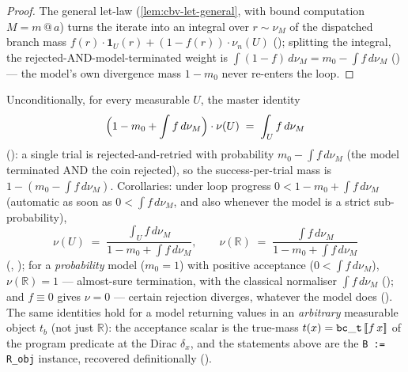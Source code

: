 \begin{proof}
The general let-law (\autoref{lem:cbv-let-general}, with bound
computation $M = m\,@\,a$) turns the iterate into an integral over
$r \sim \nu_M$ of the dispatched branch mass
$f(r)\cdot\mathbf{1}_U(r) + (1 - f(r))\cdot\nu_n(U)$
(); splitting the
integral, the rejected-AND-model-terminated weight is
$\int (1 - f)\,d\nu_M = m_0 - \int f\,d\nu_M$
() --- the model's
own divergence mass $1 - m_0$ never re-enters the loop.
\end{proof}

\begin{theorem}\label{thm:cbv-reject-model}
\rocqok
{}\rocqok
{}\rocqok
{}\rocqok
{}\rocqok
{}
Unconditionally, for every measurable $U$, the master identity
\[
  \Bigl(1 - m_0 + \int f\,d\nu_M\Bigr) \cdot \nu(U) \;=\; \int_U f\,d\nu_M
\]
(): a
single trial is rejected-and-retried with probability $m_0 - \int f\,d\nu_M$
(the model terminated AND the coin rejected), so the
success-per-trial mass is $1 - (m_0 - \int f\,d\nu_M)$. Corollaries: under loop
progress $0 < 1 - m_0 + \int f\,d\nu_M$ (automatic as soon as $0 < \int f\,d\nu_M$, and
also whenever the model is a strict sub-probability),
\[
  \nu(U) \;=\; \frac{\int_U f\,d\nu_M}{1 - m_0 + \int f\,d\nu_M},
  \qquad
  \nu(\mathbb{R}) \;=\; \frac{\int f\,d\nu_M}{1 - m_0 + \int f\,d\nu_M}
\]
(,
); for a
\emph{probability} model ($m_0 = 1$) with positive acceptance
($0 < \int f\,d\nu_M$), $\nu(\mathbb{R}) = 1$ --- almost-sure termination, with
the classical normaliser $\int f\,d\nu_M$
(); and
$f \equiv 0$ gives $\nu = 0$ --- certain rejection diverges, whatever
the model does
().
The same identities hold for a model returning values in an \emph{arbitrary}
measurable object $t_b$ (not just $\mathbb{R}$): the acceptance scalar is the
true-mass $t(x) = \mathtt{bc\_t}\,[\![ f\,x ]\!]$ of the program predicate at
the Dirac $\delta_x$, and the statements above are the
\texttt{B := R\_obj} instance, recovered definitionally
().
\end{theorem}

